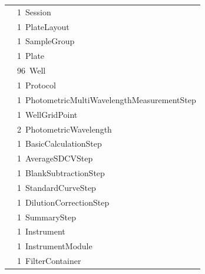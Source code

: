 \documentclass[UTF8,10pt,a4paper,fontset=fandol]{ctexart}
\newcommand{\fieldvalue}[1]{#1}
\begin{document}
\begin{center}
\begin{center}
\begin{tabular}{@{}ll@{}}
&
\fieldvalue{1\ Session}\\
&
\fieldvalue{1\ PlateLayout}\\
&
\fieldvalue{1\ SampleGroup}\\
&
\fieldvalue{1\ Plate}\\
&
\fieldvalue{96\ Well}\\
&
\fieldvalue{1\ Protocol}\\
&
\fieldvalue{1\ PhotometricMultiWavelengthMeasurementStep}\\
&
\fieldvalue{1\ WellGridPoint}\\
&
\fieldvalue{2\ PhotometricWavelength}\\
&
\fieldvalue{1\ BasicCalculationStep}\\
&
\fieldvalue{1\ AverageSDCVStep}\\
&
\fieldvalue{1\ BlankSubtractionStep}\\
&
\fieldvalue{1\ StandardCurveStep}\\
&
\fieldvalue{1\ DilutionCorrectionStep}\\
&
\fieldvalue{1\ SummaryStep}\\
&
\fieldvalue{1\ Instrument}\\
&
\fieldvalue{1\ InstrumentModule}\\
&
\fieldvalue{1\ FilterContainer}\\
\end{tabular}

\medskip


\end{center}
\end{center}
\end{document}
